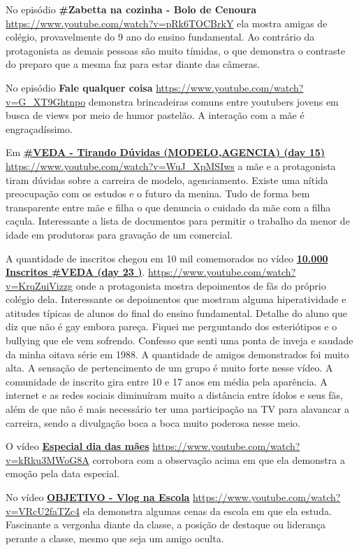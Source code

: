 No episódio \textbf{\#Zabetta na cozinha - Bolo de Cenoura} \url{https://www.youtube.com/watch?v=pRk6TOCBrkY} ela mostra amigas de colégio, provavelmente do 9 ano do ensino fundamental. Ao contrário da protagonista as demais pessoas são muito tímidas, o que demonstra o contraste do preparo que a mesma faz para estar diante das câmeras.

No episódio \textbf{Fale qualquer coisa} \url{https://www.youtube.com/watch?v=G_XT9Ghtnpo} demonstra brincadeiras comuns entre youtubers jovens em busca de views por meio de humor pastelão. A interação com a mãe é engraçadíssimo.

Em \href{https://www.youtube.com/watch?v=WuJ_XpMSIws}{\textbf{\#VEDA - Tirando Dúvidas (MODELO,AGENCIA) (day 15)}} \url{https://www.youtube.com/watch?v=WuJ_XpMSIws} a mãe e a protagonista tiram dúvidas sobre a carreira de modelo, agenciamento. Existe uma nítida preocupação com os estudos e o futuro da menina. Tudo de forma bem transparente entre mãe e filha o que denuncia o cuidado da mãe com a filha caçula. Interessante a lista de documentos para permitir o trabalho da menor de idade em produtoras para gravação de um comercial.

A quantidade de inscritos chegou em 10 mil comemorados no vídeo \href{https://www.youtube.com/watch?v=KrqZuiVizzg}{\textbf{10.000 Inscritos \#VEDA (day 23 )}}. \url{https://www.youtube.com/watch?v=KrqZuiVizzg} onde a protagonista mostra depoimentos de fãs do próprio colégio dela. Interessante os depoimentos que mostram alguma hiperatividade e atitudes típicas de alunos do final do ensino fundamental. Detalhe do aluno que diz que não é gay embora pareça. Fiquei me perguntando dos esteriótipos e o bullying que ele vem sofrendo. Confesso que senti uma ponta de inveja e saudade da minha oitava série em 1988. A quantidade de amigos demonstrados foi muito alta. A sensação de pertencimento de um grupo é muito forte nesse vídeo. A comunidade de inscrito gira entre 10 e 17 anos em média pela aparência. A internet e as redes sociais diminuíram muito a distância entre ídolos e seus fãs, além de que não é mais necessário ter uma participação na TV para alavancar a carreira, sendo a divulgação boca a boca muito poderosa nesse meio.

O vídeo \href{https://www.youtube.com/watch?v=kRku3MWoG8A}{\textbf{Especial dia das mães}} \url{https://www.youtube.com/watch?v=kRku3MWoG8A} corrobora com a observação acima em que ela demonstra a emoção pela data especial.

No vídeo \href{https://www.youtube.com/watch?v=VRcU2faTZc4}{\textbf{OBJETIVO - Vlog na Escola}} \url{https://www.youtube.com/watch?v=VRcU2faTZc4} ela demonstra algumas cenas da escola em que ela estuda. Fascinante a vergonha diante da classe, a posição de destaque ou liderança perante a classe, mesmo que seja um amigo oculta.

